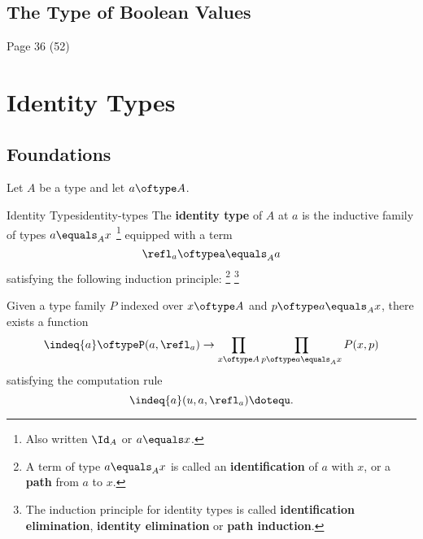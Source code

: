 \subsection{The Type of Boolean Values}\label{subsection-the-type-of-boolean-values}
Page 36 (52)
\section{Identity Types}\label{section-martin-löf-type-theory-identity-types}
\subsection{Foundations}\label{subsection-martin-löf-type-theory-identity-types-foundations}
Let $A$ be a type and let $a\oftype A$.
\begin{definition}{Identity Types}{identity-types}%
    The \textbf{identity type} of $A$ at $a$ is the inductive family of types $a\equals_{A}x$%
    \footnote{%
        Also written $\Id_{A}$ or $a\equals x$.%
    } %
    equipped with a term
    \[
        \refl_{a}%
        \oftype%
        a\equals_{A}a%
    \]%
    satisfying the following induction principle:%
    \footnote{%
        A term of type $a\equals_{A}x$ is called an \textbf{identification} of $a$ with $x$, or a \textbf{path} from $a$ to $x$.
    }%
    \footnote{%
        The induction principle for identity types is called \textbf{identification elimination}, \textbf{identity elimination} or \textbf{path induction}.
        \par\vspace*{\TCBBoxCorrection}
    }%
    \begin{itemize}
        \itemstar Given a type family $P$ indexed over $x\oftype A$ and $p\oftype a\equals_{A}x$, there exists a function
            \[
                \indeq{a}%
                \oftype%
                P(a,\refl_{a})%
                \to%
                \prod_{x\oftype A}\prod_{p\oftype a\equals_{A}x}P(x,p)%
            \]%
            satisfying the computation rule
            \[
                \indeq{a}(u,a,\refl_{a})%
                \doteq%
                u.%
            \]%
    \end{itemize}
\end{definition}
